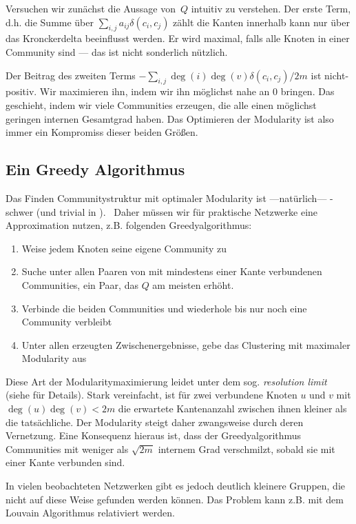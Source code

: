 Versuchen wir zunächst die Aussage von~$Q$ intuitiv zu verstehen.
Der erste Term, d.h. die Summe über $\sum_{i,j} a_{ij} \delta(c_i, c_j)$ zählt die Kanten innerhalb   kann nur über das Kronckerdelta beeinflusst werden.
Er wird maximal, falls alle Knoten in einer Community sind --- das ist nicht sonderlich nützlich.

Der Beitrag des zweiten Terms $-\sum_{i,j} \deg(i)\deg(v) \delta(c_i, c_j)/2m$ ist nicht-positiv.
Wir maximieren ihn, indem wir ihn möglichst nahe an $0$ bringen.
Das geschieht, indem wir viele Communities erzeugen, die alle einen möglichst geringen internen Gesamtgrad haben.
Das Optimieren der Modularity ist also immer ein Kompromiss dieser beiden Größen.

\subsection{Ein Greedy Algorithmus}
Das Finden Communitystruktur mit optimaler Modularity ist ---natürlich--- \NP-schwer (und trivial in \NP).~\cite{DBLP:journals/tkde/BrandesDGGHNW08}
Daher müssen wir für praktische Netzwerke eine Approximation nutzen, z.B. folgenden Greedyalgorithmus:

\begin{enumerate}
    \item Weise jedem Knoten seine eigene Community zu
    \item Suche unter allen Paaren von mit mindestens einer Kante verbundenen Communities, ein Paar, das $Q$ am meisten erhöht.
    \item Verbinde die beiden Communities und wiederhole bis nur noch eine Community verbleibt
    \item Unter allen erzeugten Zwischenergebnisse, gebe das Clustering mit maximaler Modularity aus
\end{enumerate}

Diese Art der Modularitymaximierung leidet unter dem sog. \emph{resolution limit} (siehe \cite{barabasi2014network} für Details).
Stark vereinfacht, ist für zwei verbundene Knoten $u$ und $v$ mit $\deg(u) \deg(v) < 2m$ die erwartete Kantenanzahl zwischen ihnen kleiner als die tatsächliche.
Der Modularity steigt daher zwangsweise durch deren Vernetzung.
Eine Konsequenz hieraus ist, dass der Greedyalgorithmus Communities mit weniger als $\sqrt{2m}$ internem Grad verschmilzt, sobald sie mit einer Kante verbunden sind.

In vielen beobachteten Netzwerken gibt es jedoch deutlich kleinere Gruppen, die nicht auf diese Weise gefunden werden können.
Das Problem kann z.B. mit dem Louvain Algorithmus relativiert werden.
